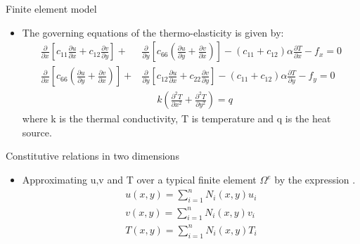 \documentclass{beamer}
\begin{document}
   \begin{frame}[t,fragile]{Finite element model}
    \begin{itemize}
        \item The governing equations of the thermo-elasticity is given by:
            \bgroup
            \tiny
            \begin{align*}
    \frac{\partial}{\partial x}\left[c_{11}\frac{\partial u}{\partial x}+c_{12}\frac{\partial v}{\partial y}\right]+&\frac{\partial}{\partial y}\left[c_{66}\left(\frac{\partial u}{\partial y}+\frac{\partial v}{\partial x}\right)\right]-(c_{11}+c_{12})\alpha\frac{\partial T}{\partial x}-f_x   =0 \\
    \frac{\partial}{\partial x}\left[c_{66}\left(\frac{\partial u}{\partial y}+\frac{\partial v}{\partial x}\right)\right]+&\frac{\partial}{\partial y}\left[c_{12}\frac{\partial u}{\partial x}+c_{22}\frac{\partial v}{\partial y}\right]-(c_{11}+c_{12})\alpha\frac{\partial T}{\partial y}-f_y=0\\
    &\ \ \ \ \ \ \ k\left( \frac{\partial^2 T}{\partial x^2}+\frac{\partial^2 T}{\partial y^2} \right)=q
\end{align*}
\egroup
where k is the thermal conductivity, T is temperature and q is the heat source.
    \end{itemize}
\end{frame}
\begin{frame}[t,fragile]{Constitutive relations in two dimensions}
    \begin{itemize}
        \item Approximating u,v and T over a typical finite element $\Omega^e$ by the expression \cite{reddy}.
\begin{align}
    u(x,y)=\sum_{i=1}^nN_i (x,y)u_i\label{u}\\
    v(x,y)=\sum_{i=1}^nN_i (x,y)v_i\label{v}\\
    T(x,y)=\sum_{i=1}^nN_i (x,y)T_i\label{t}
\end{align}
    \end{itemize}
\end{frame}
\end{document}
